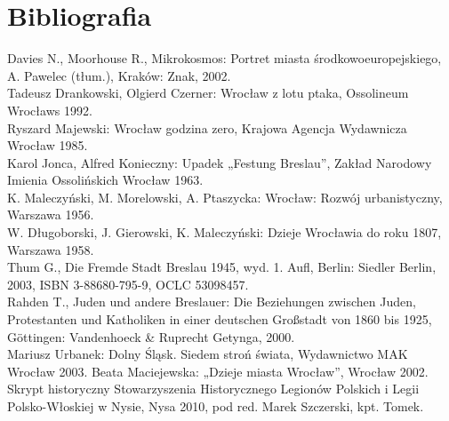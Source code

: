 \documentclass{article}
\begin{document}
\section{Bibliografia}
\bullet Davies N., Moorhouse R., Mikrokosmos: Portret miasta środkowoeuropejskiego, A. Pawelec (tłum.), Kraków: Znak, 2002.\\
\bullet Tadeusz Drankowski, Olgierd Czerner: Wrocław z lotu ptaka, Ossolineum Wrocławs 1992.\\
\bullet Ryszard Majewski: Wrocław godzina zero, Krajowa Agencja Wydawnicza Wrocław 1985.\\
\bullet Karol Jonca, Alfred Konieczny: Upadek „Festung Breslau”, Zakład Narodowy Imienia Ossolińskich Wrocław 1963.\\
\bullet K. Maleczyński, M. Morelowski, A. Ptaszycka: Wrocław: Rozwój urbanistyczny, Warszawa 1956.\\
\bullet W. Długoborski, J. Gierowski, K. Maleczyński: Dzieje Wrocławia do roku 1807, Warszawa 1958.\\
\bullet Thum G., Die Fremde Stadt Breslau 1945, wyd. 1. Aufl, Berlin: Siedler Berlin, 2003, ISBN 3-88680-795-9, OCLC 53098457.\\
\bullet Rahden T., Juden und andere Breslauer: Die Beziehungen zwischen Juden, Protestanten und Katholiken in einer deutschen Großstadt von 1860 bis 1925, Göttingen: Vandenhoeck & Ruprecht Getynga, 2000.\\
\bullet Mariusz Urbanek: Dolny Śląsk. Siedem stroń świata, Wydawnictwo MAK Wrocław 2003.
Beata Maciejewska: „Dzieje miasta Wrocław”, Wrocław 2002.\\
\bullet Skrypt historyczny Stowarzyszenia Historycznego Legionów Polskich i Legii Polsko-Włoskiej w Nysie, Nysa 2010, pod red. Marek Szczerski, kpt. Tomek.\\
\end{document}
